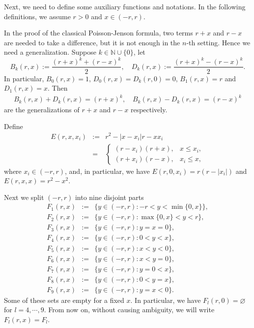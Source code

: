 \documentclass{article}
\begin{document}
Next, we need to define some auxiliary functions and notations. In the following definitions, we assume $r>0$ and $x\in(-r, r)$.

In the proof of the classical Poisson-Jenson formula, two terms $r+x$ and $r-x$ are needed to take a difference, but it is not enough in the $n$-th setting. Hence we need a generalization. Suppose $k\in\mathbb{N}\cup\{0\}$, let
\begin{equation*}
    B_{k}(r, x):=\frac{(r+x)^{k}+(r-x)^{k}}{2}, \quad D_{k}(r, x):=\frac{(r+x)^{k}-(r-x)^{k}}{2}.
\end{equation*}
In particular, $B_{0}(r, x)=1$, $D_{0}(r, x)=D_{k}(r, 0)=0$, $B_{1}(r, x)=r$ and $D_{1}(r, x)=x$. Then
\begin{eqnarray*}
    B_{k}(r, x)+D_{k}(r, x)=(r+x)^{k}, \quad B_{k}(r, x)-D_{k}(r, x)=(r-x)^{k}
\end{eqnarray*}
are the generalizations of $r+x$ and $r-x$ respectively.

Define
\begin{eqnarray*}
    E(r, x, x_{i})&:=&r^{2}-|x-x_{i}|r-xx_{i}\nonumber\\
    &=&\left\{\begin{array}{ll}
         (r-x_{i})(r+x), & x\leq x_{i},\\
         (r+x_{i})(r-x), & x_{i}\leq x,
         \end{array}\right.
\end{eqnarray*}
where $x_{i}\in(-r, r)$, and, in particular, we have $E(r, 0, x_{i})=r(r-|x_{i}|)$ and $E(r, x, x)=r^{2}-x^{2}$.

Next we split $(-r, r)$ into nine disjoint parts 
\begin{eqnarray*}
    F_{1}(r, x)&:=&\{y\in (-r, r):-r<y<\min\{0, x\}\},\\
    F_{2}(r, x)&:=&\{y\in (-r, r):\max\{0, x\}< y<r\},\\
    F_{3}(r, x)&:=&\{y\in (-r, r):y=x=0\},\\
    F_{4}(r, x)&:=&\{y\in (-r, r):0< y<x\},\\
    F_{5}(r, x)&:=&\{y\in (-r, r):x< y<0\},\\
    F_{6}(r, x)&:=&\{y\in (-r, r):x< y=0\},\\
    F_{7}(r, x)&:=&\{y\in (-r, r):y=0<x\},\\
    F_{8}(r, x)&:=&\{y\in (-r, r):0<y=x\},\\
    F_{9}(r, x)&:=&\{y\in (-r, r):y=x<0\}.
\end{eqnarray*}
Some of these sets are empty for a fixed $x$. In particular, we have $F_{l}(r, 0)=\varnothing$ for $l=4, \cdots, 9$. From now on, without causing ambiguity, we will write $F_{l}(r, x)=F_{l}$.
\end{document}
